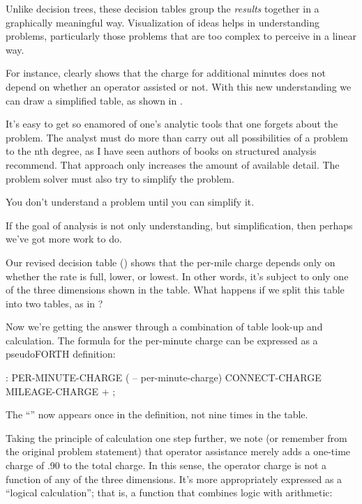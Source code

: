 Unlike decision trees, these decision tables group the \emph{results}
together in a graphically meaningful way. Visualization of ideas helps in
understanding problems, particularly those problems that are too
complex to perceive in a linear way.

For instance,  clearly shows that the charge for
additional minutes does not depend on whether an operator assisted or not.
With this new understanding we can draw a simplified table, as shown
in .



It's easy to get so enamored of one's analytic tools that one forgets
about the problem. The analyst must do more than carry out all
possibilities of a problem to the nth degree, as I have seen authors
of books on structured analysis recommend. That approach only
increases the amount of available detail. The problem solver must also
try to simplify the problem.

\begin{tip}
You don't understand a problem until you can simplify it.
\end{tip}
If the goal of analysis is not only understanding, but simplification, then
perhaps we've got more work to do.

Our revised decision table () shows that the per-mile
charge depends only on whether the rate is full, lower, or lowest. In
other words, it's subject to only one of the three dimensions shown in
the table.  What happens if we split this table into two tables, as in
?


Now we're getting the answer through a combination of table look-up
and calculation. The formula for the per-minute charge can be
expressed as a pseudoFORTH definition:

\begin{Code}
: PER-MINUTE-CHARGE ( -- per-minute-charge)
        CONNECT-CHARGE  MILEAGE-CHARGE  + ;
\end{Code}
The ``\forth{+}'' now appears once in the definition,
not nine times in the table.

Taking the principle of calculation one step further, we note (or
remember from the original problem statement) that operator assistance
merely adds a one-time charge of .90 to the total charge. In this
sense, the operator charge is not a function of any of the three
dimensions. It's more
appropriately expressed as a ``logical calculation''; that is, a
function that combines logic with arithmetic:

